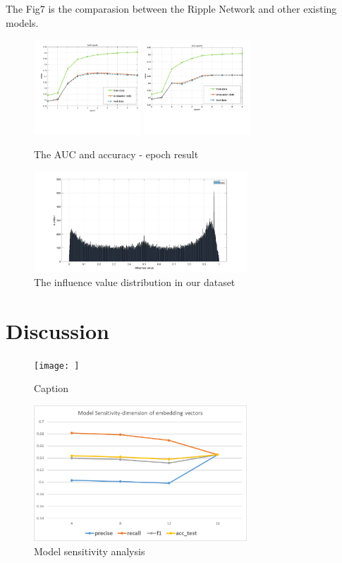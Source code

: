 \documentclass{acmtog} %
\begin{document}
The Fig7 is the comparasion between the Ripple Network and other existing models.

\begin{figure}
    \centering
    \includegraphics[width=4cm]{auc_epoch.jpg}
    \includegraphics[width=4cm]{acc_epoch.jpg}
    \caption{The AUC and accuracy - epoch result}
    \label{fig:result01}
\end{figure}

\begin{figure}
    \centering
    \includegraphics[width=8cm]{re_dis.jpg}
    \caption{The influence value distribution in our dataset}
    \label{fig:redis}
\end{figure}


\section{Discussion}

\begin{figure}
    \centering
    \texttt{[image: ]}
    \caption{Caption}
    \label{fig:my_label}
\end{figure}

\begin{figure}
    \centering
    \includegraphics[width=8cm]{sen.png}
    \caption{Model sensitivity analysis}
    \label{fig:sen}
\end{figure}
\end{document}
